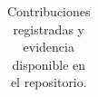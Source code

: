 \begin{table}[htbp]
\begin{tabularx}{\linewidth}{@{}lXX@{}}
\bottomrule
\end{tabularx}
\caption{Contribuciones registradas y evidencia disponible en el repositorio.}
\label{tab:aportes}
\end{table}


